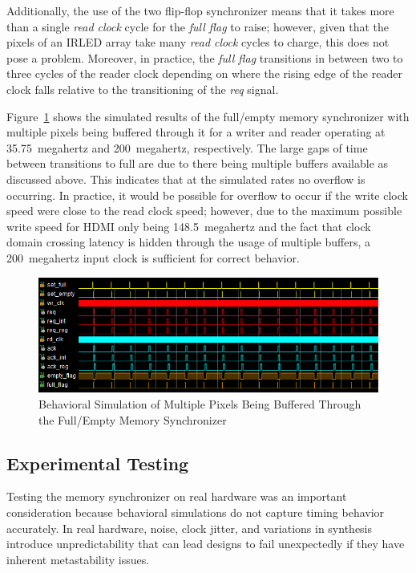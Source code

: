         Additionally, the use of the two flip-flop synchronizer means that it takes more than a single {\it read clock} cycle for the {\it full flag} to raise; however, given that the pixels of an IRLED array take many {\it read clock} cycles to charge, this does not pose a problem. Moreover, in practice, the {\it full flag} transitions in between two to three cycles of the reader clock depending on where the rising edge of the reader clock falls relative to the transitioning of the {\it req} signal.

        Figure~\ref{fig:full_empty_row_sim} shows the simulated results of the full/empty memory synchronizer with multiple pixels being buffered through it for a writer and reader operating at \mbox{35.75 megahertz} and \mbox{200 megahertz}, respectively. The large gaps of time between transitions to full are due to there being multiple buffers available as discussed above. This indicates that at the simulated rates no overflow is occurring. In practice, it would be possible for overflow to occur if the write clock speed were close to the read clock speed; however, due to the maximum possible write speed for HDMI only being \mbox{148.5 megahertz} and the fact that clock domain crossing latency is hidden through the usage of multiple buffers, a \mbox{200 megahertz} input clock is sufficient for correct behavior.

        \begin{figure}[t]
            \centering
            \includegraphics[width=1.0\textwidth]{fig/full_empty_row_sim.png}
            \caption{Behavioral Simulation of Multiple Pixels Being Buffered Through the Full/Empty Memory Synchronizer}
            \label{fig:full_empty_row_sim}
        \end{figure}

    \subsection{Experimental Testing}
        \label{sec:experimental_testing}
        Testing the memory synchronizer on real hardware was an important consideration because behavioral simulations do not capture timing behavior accurately. In real hardware, noise, clock jitter, and variations in synthesis introduce unpredictability that can lead designs to fail unexpectedly if they have inherent metastability issues.

